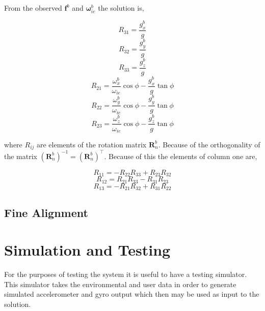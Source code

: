 \documentclass[a4paper]{report}
\numberwithin{equation}{chapter}
\newcommand{\mat}[1]{\boldsymbol{#1}}
\begin{document}
From the observed $\mat{f}^b$ and $\mat{\omega}^b_{ie}$ the solution is,

\begin{equation}
R_{31} = \frac{g^b_x}{g}
\end{equation}
\begin{equation}
R_{32} = \frac{g^b_y}{g}
\end{equation}
\begin{equation}
R_{33} = \frac{g^b_z}{g}
\end{equation}
\begin{equation}
R_{21} = \frac{\omega^b_x}{\omega_{ie}} \cos{\phi} - \frac{g^b_x}{g} \tan{\phi}
\end{equation}
\begin{equation}
R_{22} = \frac{\omega^b_y}{\omega_{ie}} \cos{\phi} - \frac{g^b_y}{g} \tan{\phi}
\end{equation}
\begin{equation}
R_{23} = \frac{\omega^b_z}{\omega_{ie}} \cos{\phi} - \frac{g^b_z}{g} \tan{\phi}
\end{equation}

where $R_{ij}$ are elements of the rotation matrix $\mat{R}^b_n$. Because of the orthogonality of the matrix $\left(\mat{R}^b_n\right)^{-1} = \left(\mat{R}^b_n\right)^\intercal$. Because of this the elements of column one are,

\begin{equation}
R_{11} = -R_{22}R_{33} + R_{23}R_{32}
\end{equation}
\begin{equation}
R_{12} = R_{21}R_{33} - R_{31}R_{23}
\end{equation}
\begin{equation}
R_{13} = -R_{21}R_{32} + R_{31}R_{22}
\end{equation}

\subsection[Fine Alignment]{Fine Alignment}



\section[Simulation and Testing]{Simulation and Testing}

For the purposes of testing the system it is useful to have a testing simulator. This simulator takes the environmental and user data in order to generate simulated accelerometer and gyro output which then may be used as input to the solution.
\end{document}
